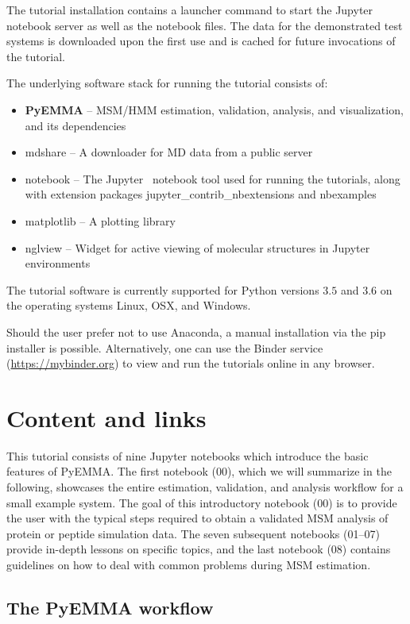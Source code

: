 \documentclass[9pt,tutorial]{livecoms}
\begin{document}
The tutorial installation contains a launcher command to start the Jupyter notebook server as well as the notebook files.
The data for the demonstrated test systems is downloaded upon the first use and is cached for future invocations of the tutorial.

The underlying software stack for running the tutorial consists of:
\begin{itemize}
\item \textbf{PyEMMA} -- MSM/HMM estimation, validation, analysis, and visualization, and its dependencies~\cite{pyemma}
\item mdshare -- A downloader for MD data from a public server
\item notebook -- The Jupyter~\cite{jupyter} notebook tool used for running the tutorials, along with extension packages jupyter\_contrib\_nbextensions and nbexamples
\item matplotlib -- A plotting library~\cite{matplotlib}
\item nglview -- Widget for active viewing of molecular structures in Jupyter environments~\cite{nglview}
\end{itemize}

The tutorial software is currently supported for Python versions $3.5$ and $3.6$ on the operating systems Linux, OSX, and Windows.

Should the user prefer not to use Anaconda, a manual installation via the pip installer is possible.
Alternatively, one can use the Binder service (\url{https://mybinder.org}) to view and run the tutorials online in any browser.

\section{Content and links}

This tutorial consists of nine Jupyter notebooks which introduce the basic features of PyEMMA.
The first notebook (00), which we will summarize in the following, showcases the entire estimation, validation, and analysis workflow for a small example system.
The goal of this introductory notebook (00) is to provide the user with the typical steps required to obtain a validated MSM analysis of protein or peptide simulation data.
The seven subsequent notebooks (01--07) provide in-depth lessons on specific topics, and the last notebook (08) contains guidelines on how to deal with common problems during MSM estimation.

\subsection{The PyEMMA workflow}
\end{document}
